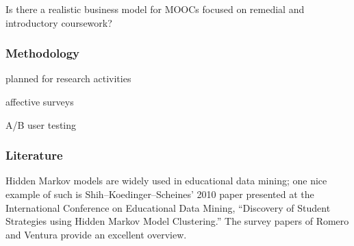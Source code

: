\documentclass[12pt]{article}
\begin{document}
Is there a realistic business model for MOOCs focused on remedial and introductory coursework?

\subsubsection*{Methodology}

planned for research activities

affective surveys

A/B user testing

\subsubsection*{Literature}

Hidden Markov models are widely used in educational data mining; one
nice example of such is Shih--Koedinger--Scheines' 2010 paper
presented at the International Conference on Educational Data Mining,
``Discovery of Student Strategies using Hidden Markov Model
Clustering.''  The survey papers of Romero and Ventura provide an
excellent overview.
\end{document}
